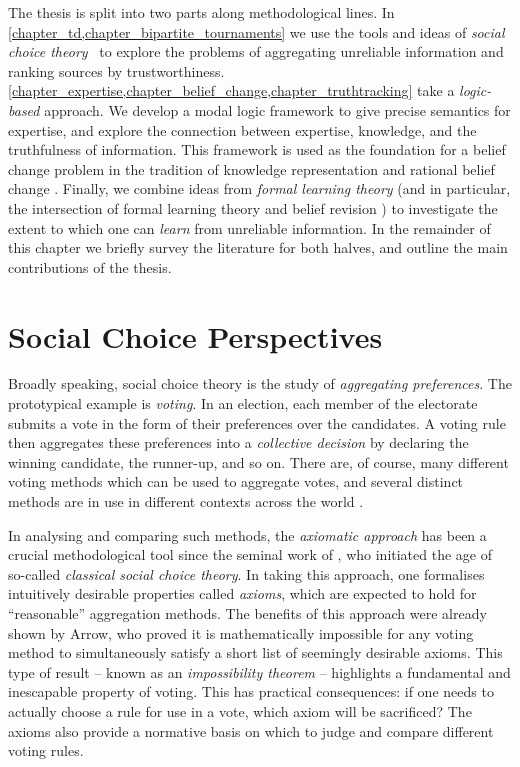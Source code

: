 The thesis is split into two parts along methodological lines. In
\cref{chapter_td,chapter_bipartite_tournaments} we use the tools and ideas of
\emph{social choice theory}~\cite{zwicker2016voting} to explore the problems of
aggregating unreliable information and ranking sources by trustworthiness.
%
%
\cref{chapter_expertise,chapter_belief_change,chapter_truthtracking} take a
\emph{logic-based} approach. We develop a modal logic framework to give precise
semantics for expertise, and explore the connection between expertise,
knowledge, and the truthfulness of information. This framework is used as the
foundation for a belief change problem in the tradition of knowledge
representation and rational belief change . Finally, we combine ideas
from \emph{formal learning theory}  (and in particular, the
intersection of formal learning theory and belief revision ) to
investigate the extent to which one can \emph{learn} from unreliable
information.
%
In the remainder of this chapter we briefly survey the literature for both
halves, and outline the main contributions of the thesis.

\section{Social Choice Perspectives}

Broadly speaking, social choice theory is the study of \emph{aggregating
preferences}. The prototypical example is \emph{voting}. In an election, each
member of the electorate submits a vote in the form of their preferences over
the candidates. A voting rule then aggregates these preferences into a
\emph{collective decision} by declaring the winning candidate, the runner-up,
and so on. There are, of course, many different voting methods which can be
used to aggregate votes, and several distinct methods are in use in different
contexts across the world .

In analysing and comparing such methods, the \emph{axiomatic approach} has been
a crucial methodological tool since the seminal work of \textcite{arrow1952},
who initiated the age of so-called \emph{classical social choice theory}. In
taking this approach, one formalises intuitively desirable properties called
\emph{axioms}, which are expected to hold for ``reasonable'' aggregation
methods. The benefits of this approach were already shown by Arrow, who proved
it is mathematically impossible for any voting method to simultaneously satisfy
a short list of seemingly desirable axioms. This type of result -- known as an
\emph{impossibility theorem} -- highlights a fundamental and inescapable
property of voting.\footnotemark{} This has practical consequences: if one
needs to actually choose a rule for use in a vote, which axiom will be
sacrificed? The axioms also provide a normative basis on which to judge and
compare different voting rules.

